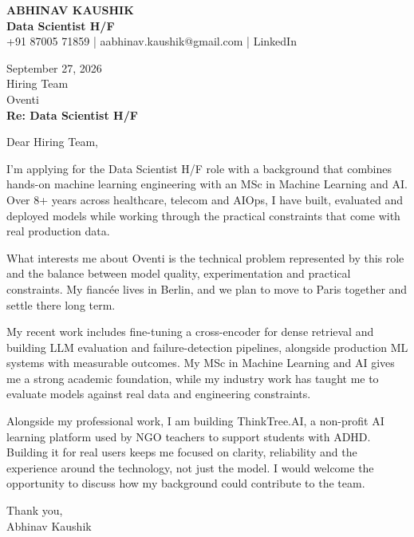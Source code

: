 \documentclass[10pt,a4paper]{article}
\begin{document}
\begin{center}
{\Large\bfseries ABHINAV KAUSHIK}\\[2pt]
{\bfseries Data Scientist H/F}\\[2pt]
+91 87005 71859 \quad | \quad aabhinav.kaushik@gmail.com \quad | \quad LinkedIn
\end{center}
\vspace{8pt}
September 27, 2026\\[6pt]
Hiring Team\\
Oventi\\[4pt]
\textbf{Re: Data Scientist H/F}

Dear Hiring Team,

I’m applying for the Data Scientist H/F role with a background that combines hands-on machine learning engineering with an MSc in Machine Learning and AI. Over 8+ years across healthcare, telecom and AIOps, I have built, evaluated and deployed models while working through the practical constraints that come with real production data.

What interests me about Oventi is the technical problem represented by this role and the balance between model quality, experimentation and practical constraints. My fiancée lives in Berlin, and we plan to move to Paris together and settle there long term.

My recent work includes fine-tuning a cross-encoder for dense retrieval and building LLM evaluation and failure-detection pipelines, alongside production ML systems with measurable outcomes. My MSc in Machine Learning and AI gives me a strong academic foundation, while my industry work has taught me to evaluate models against real data and engineering constraints.

Alongside my professional work, I am building ThinkTree.AI, a non-profit AI learning platform used by NGO teachers to support students with ADHD. Building it for real users keeps me focused on clarity, reliability and the experience around the technology, not just the model. I would welcome the opportunity to discuss how my background could contribute to the team.

Thank you,\\
Abhinav Kaushik
\end{document}
